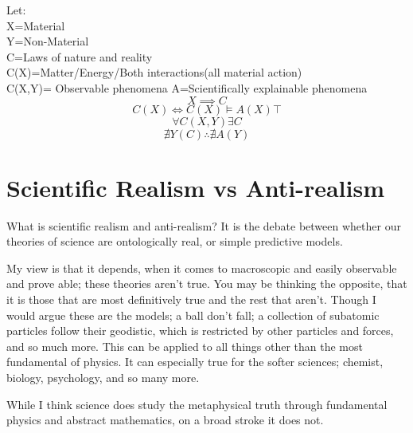Let: \\
X=Material \\
Y=Non-Material \\
C=Laws of nature and reality \\
C(X)=Matter/Energy/Both interactions(all material action) \\
C(X,Y)= Observable phenomena
A=Scientifically explainable phenomena \\
$$
X \implies C
$$
$$
C(X) \iff C(X) \models A(X) \top
$$
$$
\forall C(X,Y) \exists C
$$
$$
\nexists Y(C) \therefore \nexists A(Y)
$$
\section{Scientific Realism vs Anti-realism}
\par What is scientific realism and anti-realism? It is the debate between whether our theories of science are ontologically real, or simple predictive models. 
\par My view is that it depends, when it comes to macroscopic and easily observable and prove able; these theories aren't true. You may be thinking the opposite, that it is those that are most definitively true and the rest that aren't. Though I would argue these are the models; a ball don't fall; a collection of subatomic particles follow their geodistic, which is restricted by other particles and forces, and so much more. This can be applied to all things other than the most fundamental of physics. It can especially true for the softer sciences; chemist, biology, psychology, and so many more.
\par While I think science does study the metaphysical truth through fundamental physics and abstract mathematics, on a broad stroke it does not.
